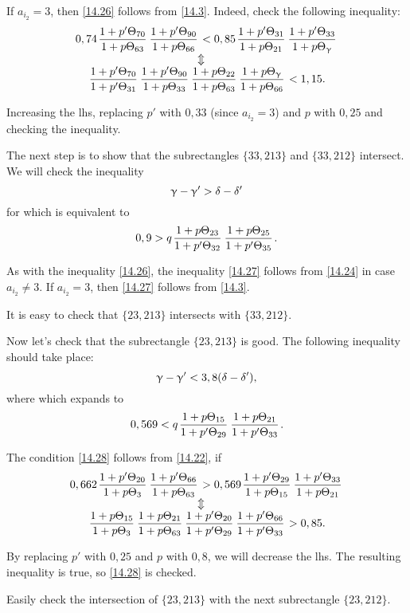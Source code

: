 If $a_{i_2} = 3$, then \ref{14.26} follows from \ref{14.3}.
Indeed, check the following inequality:
\begin{gather*}
	0,74 \pu{70}{63} \pu{90}{66} < 0,85 \pu{31}{21} \pu{33}{\g}\\
	\ArrowBetweenLines
	\pp{70}{31} \pu{90}{33} \uu{22}{63} \uu{\g}{66} < 1,15.
\end{gather*}

Increasing the lhs, replacing $p'$ with $0,33$ (since $a_{i_2} = 3$) and $p$ with $0,25$
and checking the inequality.

The next step is to show that the subrectangles $\{33, 213\}$ and $\{33, 212\}$ intersect.
We will check the inequality
\begin{equation*}
	\upgamma - \upgamma' > \delta - \delta'
\end{equation*}
for
which is equivalent to
\begin{equation}\label{14.27}
	0,9 > q \up{23}{32} \up{25}{35}.
\end{equation}

As with the inequality \ref{14.26},
the inequality \ref{14.27} follows from \ref{14.24} in case $a_{i_2} \ne 3$.
If $a_{i_2} = 3$, then \ref{14.27} follows from \ref{14.3}.

It is easy to check that $\{23, 213\}$ intersects with $\{33, 212\}$.

Now let's check that the subrectangle $\{23, 213\}$ is good.
The following inequality should take place:
\begin{equation*}
	\upgamma - \upgamma' < 3,8 (\delta - \delta'),
\end{equation*}
where
which expands to
\begin{equation}\label{14.28}
	0,569 < q \up{15}{29} \up{21}{33}.
\end{equation}

The condition \ref{14.28} follows from \ref{14.22}, if
\begin{gather*}
	0,662 \pu{20}{3} \pu{66}{63} > 0,569 \pu{29}{15} \pu{33}{21}\\
	\ArrowBetweenLines
	\uu{15}{3} \uu{21}{63} \pp{20}{29} \pp{66}{33} > 0,85.
\end{gather*}

By replacing $p'$ with $0,25$ and $p$ with $0,8$, we will decrease the lhs.
The resulting inequality is true, so \ref{14.28} is checked.

Easily check the intersection of $\{23, 213\}$ with the next subrectangle $\{23, 212\}$.

